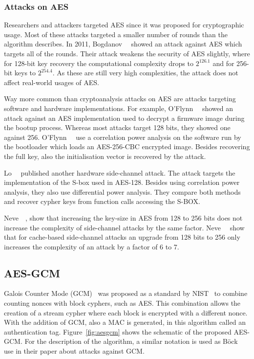 \subsubsection{Attacks on AES}

Researchers and attackers targeted AES since it was proposed for cryptographic
usage. Most of these attacks targeted a smaller number of
rounds than the algorithm describes. In 2011, Bogdanov~\etal~\cite{bicliqueaes}
showed an attack against AES which targets all of the rounds. Their attack
weakens the security of AES slightly, where for 128-bit key recovery the
computational complexity drops to $2^{126.1}$ and for 256-bit keys to
$2^{254.4}$. As these are still very high complexities, the attack does not
affect real-world usages of AES.

Way more common than cryptoanalysis attacks on AES are attacks targeting
software and hardware implementations. For example,
O'Flynn~\etal~\cite{aespowerboot} showed an attack against an AES implementation
used to decrypt a firmware image during the bootup process. Whereas most attacks
target 128 bits, they showed one against 256. O'Flynn~\etal~\cite{aespowerboot}
use a correlation power analysis on the software run by the bootloader which
loads an AES-256-CBC encrypted image. Besides recovering the full key, also the
initialisation vector is recovered by the attack.

Lo~\etal~\cite{sboxpoweranal} published another hardware side-channel attack.
The attack targets the implementation of the S-box used in AES-128. Besides
using correlation power analysis, they also use differential power analysis.
They compare both methods and recover cypher keys from function calls accessing
the S-BOX.

Neve~\etal~\cite{sidecomplex}, show that increasing the key-size in AES from 128
to 256 bits does not increase the complexity of side-channel attacks by the same
factor. Neve~\etal~\cite{sidecomplex} show that for cache-based side-channel
attacks an upgrade from 128 bits to 256 only increases the complexity of an
attack by a factor of 6 to 7.

\subsection{AES-GCM}

Galois Counter Mode (GCM)~\cite{gcm} was proposed as a standard by
NIST~\cite{gcmnist} to combine counting nonces with block cyphers, such as AES.
This combination allows the creation of a stream cypher where each block is
encrypted with a different nonce. With the addition of GCM, also a MAC is
generated, in this algorithm called an authentication tag.
Figure~\ref{fig:aesgcm} shows the schematic of the proposed AES-GCM. For the
description of the algorithm, a similar notation is used as
Böck~\etal~\cite{gcmnonceattack} use in their paper about attacks against GCM.

